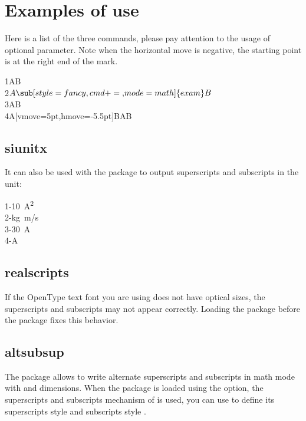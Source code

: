 \documentclass[load-preamble+]{cnltx-doc}
\begin{document}
\section{Examples of use}
Here is a list of the three commands, please pay attention to the usage of optional parameter. Note when the horizontal move is negative, the starting point is at the right end of the mark.
\begin{demohigh}
1AB \\
2$A\sub[style=fancy,cmd+=\mathsf,mode=math]{exam}B$ \\
3AB \\
4A[vmove=5pt,hmove=-5.5pt]BAB
\end{demohigh}

\subsection{siunitx}
It can also be used with the  package to output superscripts and subscripts in the unit:
\begin{demohigh}
1-\qty[mode=text]{10}{A^2} \\
2-\unit[mode=math]{kg.m/s} \\
3-\qty[mode=text]{30}{A} \\
4-\unit[mode=text]{A}
\end{demohigh}

\subsection{realscripts}
If the OpenType text font you are using does not have optical sizes, the superscripts and subscripts may not appear correctly. Loading the  package before the  package fixes this behavior.
\begin{codehigh}
\usepackage{realscripts,spbmark}
\end{codehigh}

\subsection{altsubsup}
The  package allows to write alternate superscripts and subscripts in math mode with \code{\^{}} and \code{\_{}} dimensions. When the package is loaded using the  option, the superscripts and subscripts mechanism of  is used, you can use  to define its superscripts style  and subscripts style .
\end{document}

